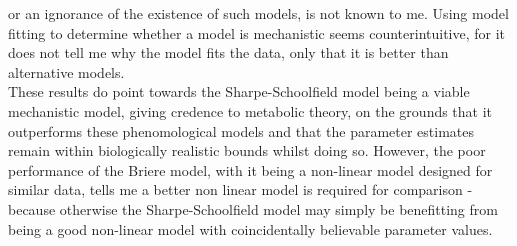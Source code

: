 \documentclass[fontsize=11pt]{scrartcl}\usepackage[]{graphicx}\usepackage[]{color}
\begin{document}
  or an ignorance of the existence of such models, is not known to me. Using model fitting to determine whether a 
  model is mechanistic seems counterintuitive, for it does not tell me why the model fits the data, only that 
  it is better than alternative models. \\
  These results do point towards the Sharpe-Schoolfield model being a viable mechanistic model, giving credence
  to metabolic theory, on the grounds that it outperforms 
  these phenomological models and that the parameter estimates remain within biologically realistic bounds whilst doing so. 
  However, the poor performance of the Briere model, with it being a non-linear 
  model designed for similar data, tells me a better non linear model is required for comparison - because otherwise 
  the Sharpe-Schoolfield model may simply be benefitting from being a good non-linear model with coincidentally believable 
  parameter values.

  
  
\end{document}
